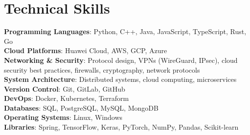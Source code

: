 \documentclass[letterpaper,11pt]{article}
\begin{document}
\section{Technical Skills}
 \begin{itemize}[leftmargin=0.15in, label={}]
    \small{\item{
     \textbf{Programming Languages}{: Python, C++, Java, JavaScript, TypeScript, Rust, Go}\\
     \textbf{Cloud Platforms}{: Huawei Cloud, AWS, GCP, Azure}\\
     \textbf{Networking \& Security}{: Protocol design, VPNs (WireGuard, IPsec), cloud security best practices, firewalls, cryptography, network protocols} \\
     \textbf{System Architecture}{: Distributed systems,  cloud computing, microservices}\\
     \textbf{Version Control}{: Git, GitLab, GitHub}\\
     \textbf{DevOps}{: Docker, Kubernetes, Terraform}\\
      \textbf{Databases}{: SQL, PostgreSQL, MySQL, MongoDB}\\
      \textbf{Operating Systems}{: Linux, Windows}\\
     \textbf{Libraries}{: Spring, TensorFlow, Keras, PyTorch, NumPy, Pandas, Scikit-learn}
    }}
 \end{itemize}

\end{document}
